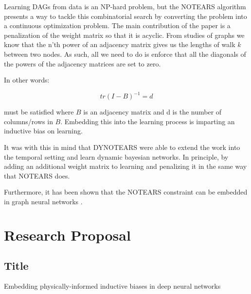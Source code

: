 \documentclass{article}
\begin{document}
Learning DAGs from data is an NP-hard problem, but the NOTEARS algorithm \cite{zheng_dags_2018} presents a way to tackle this combinatorial search by converting the problem into a continuous optimization problem. The main contribution of the paper is a penalization of the weight matrix so that it is acyclic. From studies of graphs we know that the n'th power of an adjacency matrix gives us the lengths of walk $k$ between two nodes. As such, all we need to do is enforce that all the diagonals of the powers of the adjacency matrices are set to zero. 

In other words:

$$ tr(I-B)^{-1} = d $$

must be satisfied where $B$ is an adjacency matrix and d is the number of columns/rows in $B$. Embedding this into the learning process is imparting an inductive bias on learning. 

It was with this in mind that DYNOTEARS \cite{pamfil_dynotears_2020} were able to extend the work into the temporal setting and learn dynamic bayesian networks. In principle, by adding an additional weight matrix to learning and penalizing it in the same way that NOTEARS does.

Furthermore, it has been shown that the NOTEARS constraint can be embedded in graph neural networks \cite{lachapelle_gradient-based_2020,yu_dag-gnn_nodate}.

\pagebreak
\section{Research Proposal}

\subsection*{Title}

Embedding physically-informed inductive biases in deep neural networks
\end{document}
